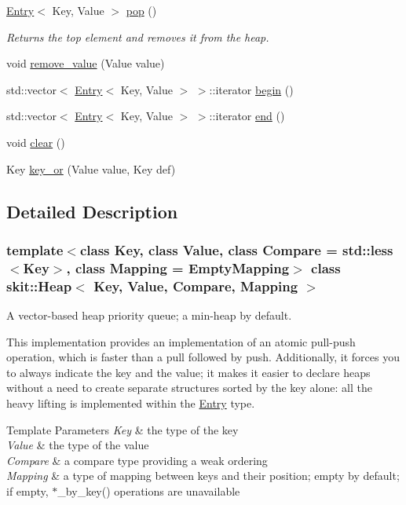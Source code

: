 \begin{DoxyCompactItemize}
\hyperlink{structskit_1_1Entry}{Entry}$<$ Key, Value $>$ \hyperlink{classskit_1_1Heap_adad991120658a69a49c69d5b9505df25}{pop} ()
\begin{DoxyCompactList}\small\item\em Returns the top element and removes it from the heap. \end{DoxyCompactList}\item 
void \hyperlink{classskit_1_1Heap_abc4375c61acfca13fc1e7784aff5c140}{remove\+\_\+value} (Value value)
\item 
std\+::vector$<$ \hyperlink{structskit_1_1Entry}{Entry}$<$ Key, Value $>$ $>$\+::iterator \hyperlink{classskit_1_1Heap_a53b780fcc5f6e20a8ae04e3e31965ea1}{begin} ()
\item 
std\+::vector$<$ \hyperlink{structskit_1_1Entry}{Entry}$<$ Key, Value $>$ $>$\+::iterator \hyperlink{classskit_1_1Heap_ace004b7476332900f9d2823936948f83}{end} ()
\item 
void \hyperlink{classskit_1_1Heap_a4b66a7a19e736474fecbd8cbd9c805fd}{clear} ()
\item 
Key \hyperlink{classskit_1_1Heap_acd46189f185f73307dea42c1af4257b9}{key\+\_\+or} (Value value, Key def)
\end{DoxyCompactItemize}


\subsection{Detailed Description}
\subsubsection*{template$<$class Key, class Value, class Compare = std\+::less$<$\+Key$>$, class Mapping = Empty\+Mapping$>$\newline
class skit\+::\+Heap$<$ Key, Value, Compare, Mapping $>$}

A vector-\/based heap priority queue; a min-\/heap by default.

This implementation provides an implementation of an atomic pull-\/push operation, which is faster than a pull followed by push. Additionally, it forces you to always indicate the key and the value; it makes it easier to declare heaps without a need to create separate structures sorted by the key alone\+: all the heavy lifting is implemented within the \hyperlink{structskit_1_1Entry}{Entry} type.


\begin{DoxyTemplParams}{Template Parameters}
{\em Key} & the type of the key \\
\hline
{\em Value} & the type of the value \\
\hline
{\em Compare} & a compare type providing a weak ordering \\
\hline
{\em Mapping} & a type of mapping between keys and their position; empty by default; if empty, $\ast$\+\_\+by\+\_\+key() operations are unavailable \\
\hline
\end{DoxyTemplParams}


